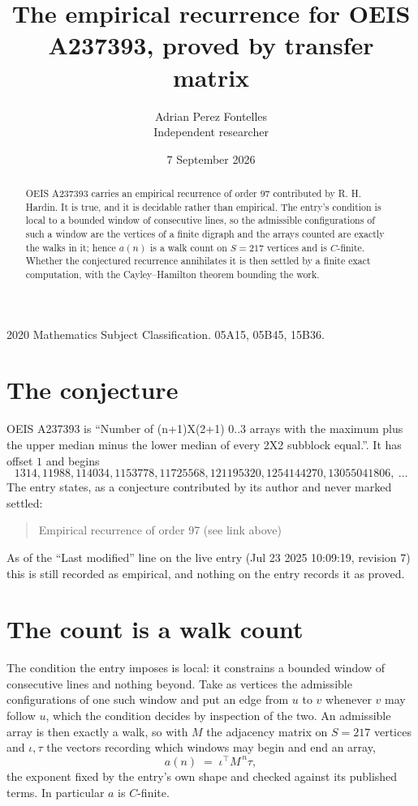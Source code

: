 \documentclass[11pt,a4paper]{article}
\title{The empirical recurrence for OEIS A237393, proved by transfer matrix}
\author{Adrian Perez Fontelles\\ \small Independent researcher}
\date{7 September 2026}
\theoremstyle{plain}
\theoremstyle{definition}
\begin{document}
\maketitle

\begin{abstract}
OEIS A237393 carries an empirical recurrence of order $97$ contributed by R. H. Hardin. It is
true, and it is decidable rather than empirical. The entry's condition is local to a bounded window of consecutive lines, so
the admissible configurations of such a window are the vertices of a finite digraph and the
arrays counted are exactly the walks in it; hence $a(n)$ is a walk count on $S=217$ vertices
and is $C$-finite. Whether the conjectured recurrence annihilates it is then settled by a
finite exact computation, with the Cayley--Hamilton theorem bounding the work.
\end{abstract}

\noindent\small 2020 Mathematics Subject Classification. 05A15, 05B45, 15B36.\normalsize

\section{The conjecture}

OEIS A237393 is ``Number of (n+1)X(2+1) 0..3 arrays with the maximum plus the upper median minus the lower median of every 2X2 subblock equal.''. It has offset $1$ and begins
\[
1314, 11988, 114034, 1153778, 11725568, 121195320, 1254144270, 13055041806,\ \dots
\]
The entry states, as a conjecture contributed by its author and never marked settled:
\begin{quote}
Empirical recurrence of order 97 (see link above)
\end{quote}
As of the ``Last modified'' line on the live entry (Jul 23 2025 10:09:19, revision 7) this is still
recorded as empirical, and nothing on the entry records it as proved.

\section{The count is a walk count}

The condition the entry imposes is local: it constrains a bounded window of consecutive lines and nothing beyond. Take as
vertices the admissible configurations of one such window and put an edge from $u$ to $v$
whenever $v$ may follow $u$, which the condition decides by inspection of the two. An
admissible array is then exactly a walk, so with $M$ the adjacency matrix on $S=217$ vertices
and $\iota,\tau$ the vectors recording which windows may begin and end an array,
\[
a(n)\;=\;\iota^{\!\top}M^{\,n}\tau ,
\]
the exponent fixed by the entry's own shape and checked against its published terms. In
particular $a$ is $C$-finite.
\end{document}
